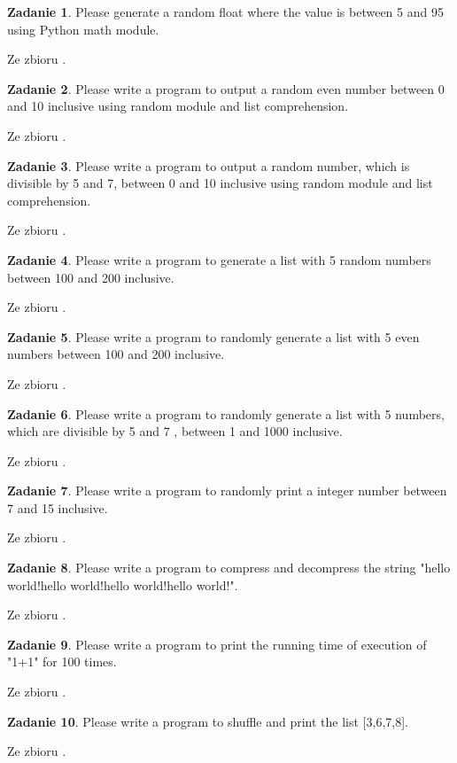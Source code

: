 \documentclass[11pt]{article}
\theoremstyle{definition}
\newtheorem{zadanie}{Zadanie}
\newcommand{\fromA}{\small Ze zbioru \cite{python100}.}
\begin{document}
\begin{zadanie}
Please generate a random float where the value is between 5 and 95 using Python math module.

\fromA
\end{zadanie}
\begin{zadanie}
Please write a program to output a random even number between 0 and 10 inclusive using random module and list comprehension.

\fromA
\end{zadanie}
\begin{zadanie}
Please write a program to output a random number, which is divisible by 5 and 7, between 0 and 10 inclusive using random module and list comprehension.

\fromA
\end{zadanie}
\begin{zadanie}
Please write a program to generate a list with 5 random numbers between 100 and 200 inclusive.

\fromA
\end{zadanie}
\begin{zadanie}
Please write a program to randomly generate a list with 5 even numbers between 100 and 200 inclusive.

\fromA
\end{zadanie}
\begin{zadanie}
Please write a program to randomly generate a list with 5 numbers, which are divisible by 5 and 7 , between 1 and 1000 inclusive.

\fromA
\end{zadanie}
\begin{zadanie}
Please write a program to randomly print a integer number between 7 and 15 inclusive.

\fromA
\end{zadanie}
\begin{zadanie}
Please write a program to compress and decompress the string "hello world!hello world!hello world!hello world!".

\fromA
\end{zadanie}
\begin{zadanie}
Please write a program to print the running time of execution of "1+1" for 100 times.

\fromA
\end{zadanie}
\begin{zadanie}
Please write a program to shuffle and print the list [3,6,7,8].

\fromA
\end{zadanie}
\end{document}
